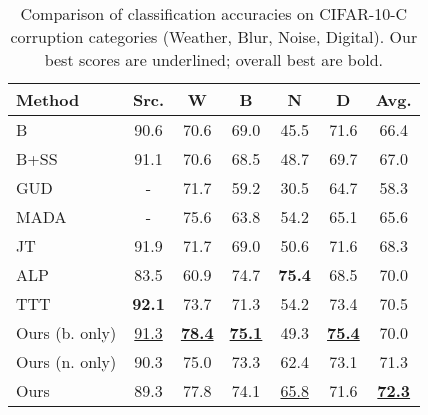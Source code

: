 \begin{table}
    \centering
    \begin{tabular}{l cccccc}
        \toprule 
        \textbf{Method} & \textbf{Src.} & \textbf{W} & \textbf{B} & \textbf{N} & \textbf{D} & \textbf{Avg.} \\
        \toprule 
        B       & 90.6 & 70.6 & 69.0 & 45.5 & 71.6 & 66.4\\
        B+SS    & 91.1 & 70.6 & 68.5 & 48.7 & 69.7 & 67.0\\
        GUD     & - & 71.7 & 59.2 & 30.5 & 64.7 & 58.3\\
        MADA    & - & 75.6 & 63.8 & 54.2 & 65.1 & 65.6\\
        JT      & 91.9 & 71.7 & 69.0 & 50.6 & 71.6 & 68.3\\
        ALP     & 83.5 & 60.9 & 74.7 & \textbf{75.4} & 68.5& 70.0\\
        TTT     & \textbf{92.1} & 73.7 & 71.3 & 54.2 & 73.4 & 70.5\\
        \midrule
        Ours (b. only) & \underline{91.3} & \underline{\textbf{78.4}} & \underline{\textbf{75.1}} & 49.3 & \underline{\textbf{75.4}} & 70.0\\
        Ours (n. only) & 90.3 & 75.0 & 73.3 & 62.4 & 73.1 & 71.3 \\
        Ours    & 89.3 & 77.8 & 74.1 & \underline{65.8} & 71.6 & \underline{\textbf{72.3}} \\
        \bottomrule
    \end{tabular}
    \caption{Comparison of classification accuracies on CIFAR-10-C corruption categories (Weather, Blur, Noise, Digital). Our best scores are underlined; overall best are bold.}
    \label{tab:cifar_cat}
\end{table}